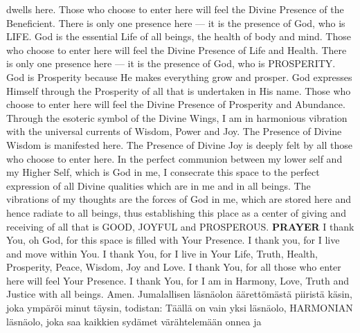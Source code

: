 {\begin{songs}{}
        dwells here. Those who choose to enter here will
        feel the Divine Presence of the Beneficient.
        \parspace
        There is only one presence here --- it is the
        presence of God, who is LIFE. God is the essential
        Life of all beings, the health of body and mind.
        Those who choose to enter here will feel the Divine
        Presence of Life and Health.
        \parspace
        There is only one presence here --- it is the
        presence of God, who is PROSPERITY. God is
        Prosperity because He makes everything grow and
        prosper. God expresses Himself through the
        Prosperity of all that is undertaken in His name.
        Those who choose to enter here will feel the
        Divine Presence of Prosperity and Abundance.
        \parspace
        Through the esoteric symbol of the Divine Wings,
        I am in harmonious vibration with the universal
        currents of Wisdom, Power and Joy. The Presence
        of Divine Wisdom is manifested here. The Presence
        of Divine Joy is deeply felt by all those who choose
        to enter here.
        \parspace
        In the perfect communion between my lower self and
        my Higher Self, which is God in me, I consecrate
        this space to the perfect expression of all Divine
        qualities which are in me and in all beings.
        \parspace
        The vibrations of my thoughts are the forces of God
        in me, which are stored here and hence radiate to
        all beings, thus establishing this place as a center
        of giving and receiving of all that is GOOD, JOYFUL
        and PROSPEROUS.
        \parspace
        \textbf{PRAYER}
        \parspace
        I thank You, oh God, for this space is filled with
        Your Presence.
        \parspace
        I thank you, for I live and move within You.
        \parspace
        I thank You, for I live in Your Life, Truth, Health,
        Prosperity, Peace, Wisdom, Joy and Love.
        \parspace
        I thank You, for all those who enter here will feel
        Your Presence.
        \parspace
        I thank You, for I am in Harmony, Love, Truth and
        Justice with all beings.
        \parspace
        Amen.
      \endverse
      \beginverse\color{finnishcolor}
        \parspace
        Jumalallisen läsnäolon äärettömästä piiristä käsin,
        joka ympäröi minut täysin, todistan:
        \parspace
        Täällä on vain yksi läsnäolo, HARMONIAN läsnäolo,
        joka saa kaikkien sydämet värähtelemään  onnea ja

\end{songs}}
